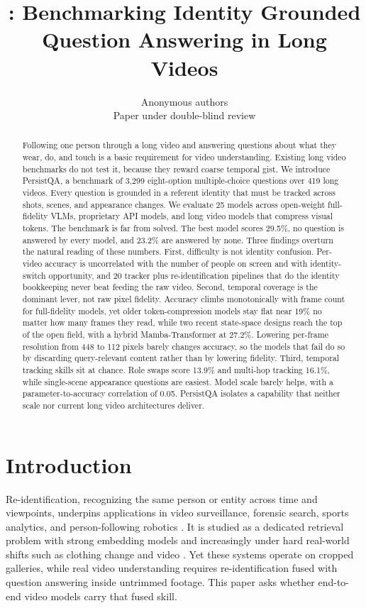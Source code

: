 \documentclass{article}
\title{\bench: Benchmarking Identity Grounded \\ Question Answering in Long Videos}
\author{Anonymous authors\\
Paper under double-blind review}
\newcommand{\bench}{PersistQA}
\newcommand{\numq}{3{,}299}
\newcommand{\numv}{419}
\newcommand{\nummodels}{25}
\begin{document}
\maketitle

\begin{abstract}
Following one person through a long video and answering questions about what they wear, do, and touch is a basic requirement for video understanding. Existing long video benchmarks do not test it, because they reward coarse temporal gist. We introduce \bench, a benchmark of \numq{} eight-option multiple-choice questions over \numv{} long videos. Every question is grounded in a referent identity that must be tracked across shots, scenes, and appearance changes. We evaluate \nummodels{} models across open-weight full-fidelity VLMs, proprietary API models, and long video models that compress visual tokens. The benchmark is far from solved. The best model scores 29.5\%, no question is answered by every model, and 23.2\% are answered by none. Three findings overturn the natural reading of these numbers. First, difficulty is not identity confusion. Per-video accuracy is uncorrelated with the number of people on screen and with identity-switch opportunity, and 20 tracker plus re-identification pipelines that do the identity bookkeeping never beat feeding the raw video. Second, temporal coverage is the dominant lever, not raw pixel fidelity. Accuracy climbs monotonically with frame count for full-fidelity models, yet older token-compression models stay flat near 19\% no matter how many frames they read, while two recent state-space designs reach the top of the open field, with a hybrid Mamba-Transformer at 27.2\%. Lowering per-frame resolution from 448 to 112 pixels barely changes accuracy, so the models that fail do so by discarding query-relevant content rather than by lowering fidelity. Third, temporal tracking skills sit at chance. Role swaps score 13.9\% and multi-hop tracking 16.1\%, while single-scene appearance questions are easiest. Model scale barely helps, with a parameter-to-accuracy correlation of 0.05. \bench{} isolates a capability that neither scale nor current long video architectures deliver.
\end{abstract}



\section{Introduction}
Re-identification, recognizing the same person or entity across time and viewpoints, underpins applications in video surveillance, forensic search, sports analytics, and person-following robotics \citep{reidsurvey,market1501,mevid}. It is studied as a dedicated retrieval problem with strong embedding models \citep{osnet,transreid,clipreid,solider} and increasingly under hard real-world shifts such as clothing change \citep{differ,prcc,ltcc,vcclothes} and video \citep{mars,tfclip,keyreid}. Yet these systems operate on cropped galleries, while real video understanding requires re-identification fused with question answering inside untrimmed footage. This paper asks whether end-to-end video models carry that fused skill.
\end{document}

